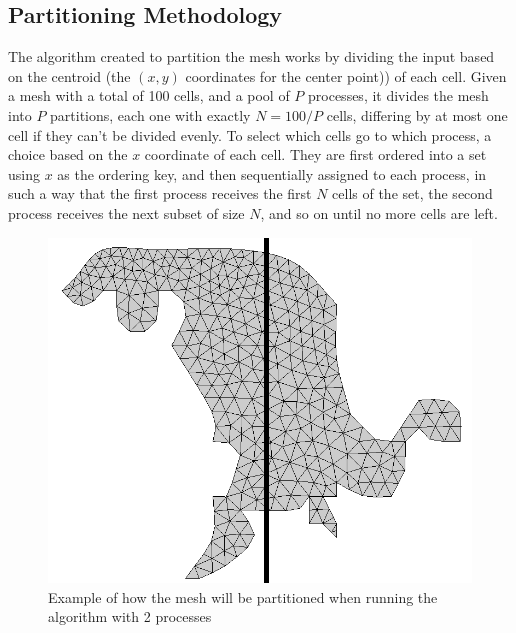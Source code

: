 \subsection{Partitioning Methodology}
\label{subsec:part_method}

The algorithm created to partition the mesh works by dividing the input based on the centroid (the $(x, y)$ coordinates for the center point)) of each cell. Given a mesh with a total of 100 cells, and a pool of $P$ processes, it divides the mesh into $P$ partitions, each one with exactly $N=100/P$ cells, differing by at most one cell if they can't be divided evenly. To select which cells go to which process, a choice based on the $x$ coordinate of each cell. They are first ordered into a set using $x$ as the ordering key, and then sequentially assigned to each process, in such a way that the first process receives the first $N$ cells of the set, the second process receives the next subset of size $N$, and so on until no more cells are left.

\begin{figure}[!htp]
	\begin{center}
		\includegraphics[width=\columnwidth]{report.may/images/foz_p2_msh}
	\end{center}
	\caption{Example of how the mesh will be partitioned when running the algorithm with 2 processes}
	\label{fig:tasktimeAOS}
\end{figure}

